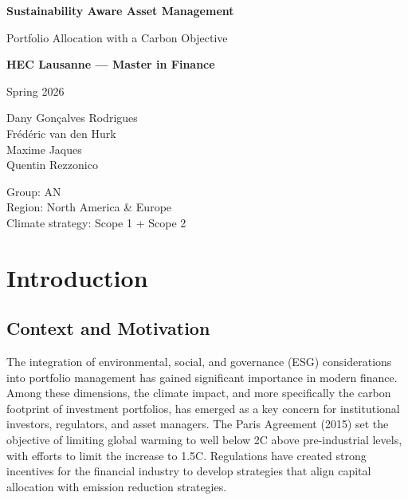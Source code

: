\documentclass[11pt,a4paper]{article}
\begin{document}
\begin{titlepage}
    \centering
    {\Large \textbf{Sustainability Aware Asset Management} \par}
    \vspace{0.4cm}
    {\large Portfolio Allocation with a Carbon Objective \par}
    \vspace{1.2cm}

    {\normalsize \textbf{HEC Lausanne --- Master in Finance} \par}
    {\normalsize Spring 2026 \par}

    \vspace{1cm}

    {\normalsize
    Dany Gonçalves Rodrigues \\
    Frédéric van den Hurk \\
    Maxime Jaques \\
    Quentin Rezzonico
    \par}

    \vspace{0.8cm}

    {\normalsize
    Group: AN\\
    Region: North America \& Europe \\
    Climate strategy: Scope 1 + Scope 2
    \par}

    \vfill
\end{titlepage}

\tableofcontents
\newpage

\section{Introduction}

\subsection{Context and Motivation}

The integration of environmental, social, and governance (ESG) considerations into portfolio management has gained significant importance in modern finance. Among these dimensions, the climate impact, and more specifically the carbon footprint of investment portfolios, has emerged as a key concern for institutional investors, regulators, and asset managers. The Paris Agreement (2015) set the objective of limiting global warming to well below 2\textdegree C above pre-industrial levels, with efforts to limit the increase to 1.5\textdegree C. Regulations have created strong incentives for the financial industry to develop strategies that align capital allocation with emission reduction strategies.
\end{document}
